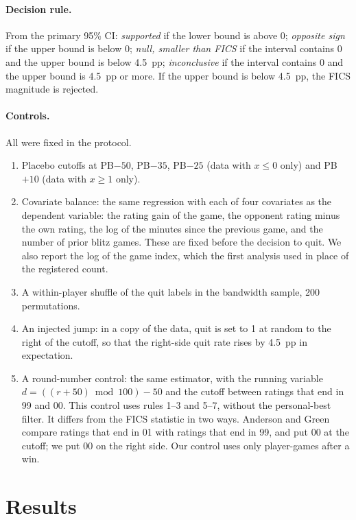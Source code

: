 \documentclass[11pt]{article}
\begin{document}
\paragraph{Decision rule.} From the primary 95\% CI: \emph{supported} if the lower bound is above 0; \emph{opposite sign} if the upper bound is below 0; \emph{null, smaller than FICS} if the interval contains 0 and the upper bound is below 4.5~pp; \emph{inconclusive} if the interval contains 0 and the upper bound is 4.5~pp or more. If the upper bound is below 4.5~pp, the FICS magnitude is rejected.

\paragraph{Controls.}\label{sec:controls} All were fixed in the protocol.
\begin{enumerate}
\item Placebo cutoffs at PB$-50$, PB$-35$, PB$-25$ (data with $x\le 0$ only) and PB$+10$ (data with $x \ge 1$ only).
\item Covariate balance: the same regression with each of four covariates as the dependent variable: the rating gain of the game, the opponent rating minus the own rating, the log of the minutes since the previous game, and the number of prior blitz games. These are fixed before the decision to quit. We also report the log of the game index, which the first analysis used in place of the registered count.
\item A within-player shuffle of the quit labels in the bandwidth sample, 200 permutations.
\item An injected jump: in a copy of the data, quit is set to 1 at random to the right of the cutoff, so that the right-side quit rate rises by 4.5~pp in expectation.
\item A round-number control: the same estimator, with the running variable $d = ((r+50) \bmod 100) - 50$ and the cutoff between ratings that end in 99 and 00. This control uses rules 1--3 and 5--7, without the personal-best filter. It differs from the FICS statistic in two ways. Anderson and Green compare ratings that end in 01 with ratings that end in 99, and put 00 at the cutoff; we put 00 on the right side. Our control uses only player-games after a win.
\end{enumerate}

\section{Results}\label{sec:results}
\end{document}
